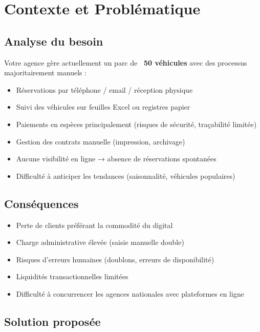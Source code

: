\documentclass[12pt, a4paper]{article}
\begin{document}
\section{Contexte et Problématique}

\subsection{Analyse du besoin}

Votre agence gère actuellement un parc de \textbf{~50 véhicules} avec des processus majoritairement manuels :
\begin{itemize}[leftmargin=*,noitemsep]
  \item Réservations par téléphone / email / réception physique
  \item Suivi des véhicules sur feuilles Excel ou registres papier
  \item Paiements en espèces principalement (risques de sécurité, traçabilité limitée)
  \item Gestion des contrats manuelle (impression, archivage)
  \item Aucune visibilité en ligne → absence de réservations spontanées
  \item Difficulté à anticiper les tendances (saisonnalité, véhicules populaires)
\end{itemize}

\subsection{Conséquences}
\begin{itemize}[leftmargin=*,noitemsep]
  \item Perte de clients préférant la commodité du digital
  \item Charge administrative élevée (saisie manuelle double)
  \item Risques d'erreurs humaines (doublons, erreurs de disponibilité)
  \item Liquidités transactionnelles limitées
  \item Difficulté à concurrencer les agences nationales avec plateformes en ligne
\end{itemize}

\subsection{Solution proposée}
\end{document}
